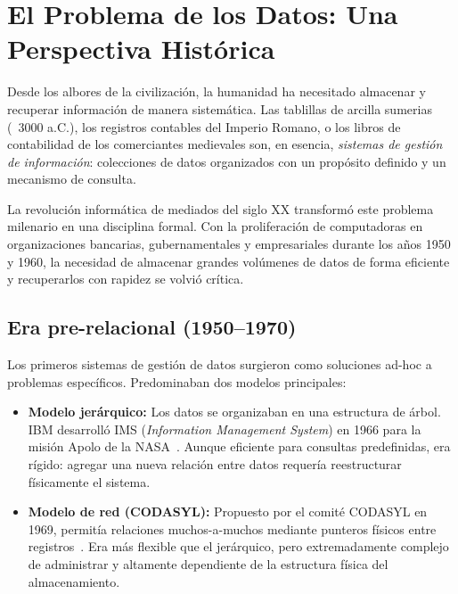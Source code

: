 \section{El Problema de los Datos: Una Perspectiva Histórica}

Desde los albores de la civilización, la humanidad ha necesitado
almacenar y recuperar información de manera sistemática.
Las tablillas de arcilla sumerias (~3000 a.C.), los registros
contables del Imperio Romano, o los libros de contabilidad de los
comerciantes medievales son, en esencia, \textit{sistemas de gestión
de información}: colecciones de datos organizados con un propósito
definido y un mecanismo de consulta.

La revolución informática de mediados del siglo XX transformó este
problema milenario en una disciplina formal.
Con la proliferación de computadoras en organizaciones bancarias,
gubernamentales y empresariales durante los años 1950 y 1960,
la necesidad de almacenar grandes volúmenes de datos de forma
eficiente y recuperarlos con rapidez se volvió crítica.

\subsection{Era pre-relacional (1950–1970)}

Los primeros sistemas de gestión de datos surgieron como soluciones
ad-hoc a problemas específicos.
Predominaban dos modelos principales:

\begin{itemize}
  \item \textbf{Modelo jerárquico:} Los datos se organizaban en una
    estructura de árbol. IBM desarrolló IMS
    (\textit{Information Management System}) en 1966 para la misión
    Apolo de la NASA~\cite{date2003introduction}.
    Aunque eficiente para consultas predefinidas, era rígido:
    agregar una nueva relación entre datos requería reestructurar
    físicamente el sistema.

  \item \textbf{Modelo de red (CODASYL):} Propuesto por el comité
    CODASYL en 1969, permitía relaciones muchos-a-muchos mediante
    punteros físicos entre registros~\cite{codasyl1971}.
    Era más flexible que el jerárquico, pero extremadamente complejo
    de administrar y altamente dependiente de la estructura física
    del almacenamiento.
\end{itemize}

